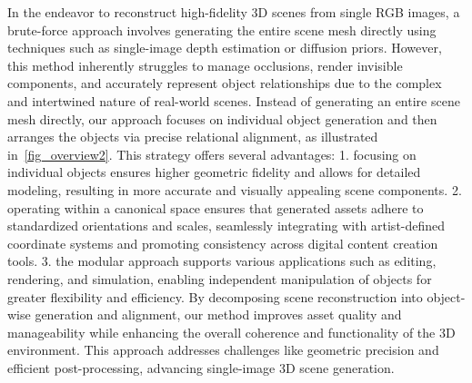 In the endeavor to reconstruct high-fidelity 3D scenes from single RGB images, a brute-force approach involves generating the entire scene mesh directly using techniques such as single-image depth estimation or diffusion priors. However, this method inherently struggles to manage occlusions, render invisible components, and accurately represent object relationships due to the complex and intertwined nature of real-world scenes. 
Instead of generating an entire scene mesh directly, our approach focuses on individual object generation and then arranges the objects via precise relational alignment, as illustrated in~\ref{fig_overview2}. This strategy offers several advantages: 1. focusing on individual objects ensures higher geometric fidelity and allows for detailed modeling, resulting in more accurate and visually appealing scene components.
%
2. operating within a canonical space ensures that generated assets adhere to standardized orientations and scales, seamlessly integrating with artist-defined coordinate systems and promoting consistency across digital content creation tools.
%
3. the modular approach supports various applications such as editing, rendering, and simulation, enabling independent manipulation of objects for greater flexibility and efficiency.
%
By decomposing scene reconstruction into object-wise generation and alignment, our method improves asset quality and manageability while enhancing the overall coherence and functionality of the 3D environment. This approach addresses challenges like geometric precision and efficient post-processing, advancing single-image 3D scene generation.

